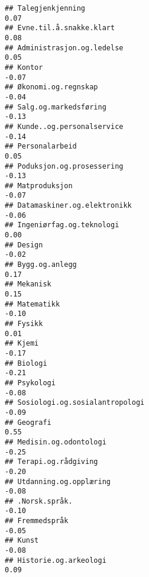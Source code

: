 \documentclass[
]{article}
\begin{document}
\begin{verbatim}
## Talegjenkjenning                                                                  0.07
## Evne.til.å.snakke.klart                                                           0.08
## Administrasjon.og.ledelse                                                         0.05
## Kontor                                                                           -0.07
## Økonomi.og.regnskap                                                              -0.04
## Salg.og.markedsføring                                                            -0.13
## Kunde..og.personalservice                                                        -0.14
## Personalarbeid                                                                    0.05
## Poduksjon.og.prosessering                                                        -0.13
## Matproduksjon                                                                    -0.07
## Datamaskiner.og.elektronikk                                                      -0.06
## Ingeniørfag.og.teknologi                                                          0.00
## Design                                                                           -0.02
## Bygg.og.anlegg                                                                    0.17
## Mekanisk                                                                          0.15
## Matematikk                                                                       -0.10
## Fysikk                                                                            0.01
## Kjemi                                                                            -0.17
## Biologi                                                                          -0.21
## Psykologi                                                                        -0.08
## Sosiologi.og.sosialantropologi                                                   -0.09
## Geografi                                                                          0.55
## Medisin.og.odontologi                                                            -0.25
## Terapi.og.rådgiving                                                              -0.20
## Utdanning.og.opplæring                                                           -0.08
## .Norsk.språk.                                                                    -0.10
## Fremmedspråk                                                                     -0.05
## Kunst                                                                            -0.08
## Historie.og.arkeologi                                                             0.09

\end{verbatim}
\end{document}
